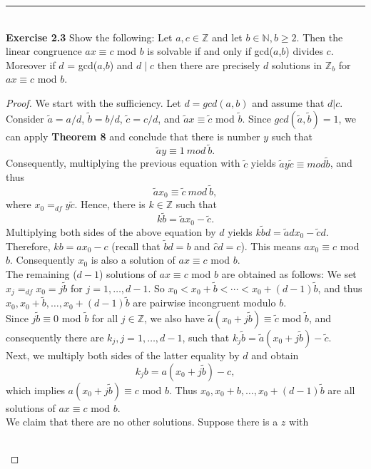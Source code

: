 \documentclass[a4paper]{article}
\begin{document}
\noindent\rule{12cm}{0.4pt}\\
\noindent \textbf{Exercise 2.3} Show the following:
Let $a, c \in \mathbb{Z}$ and let $b \in \mathbb{N}, b \geq 2$. Then the linear congruence $ax \equiv c$ mod $b$ is solvable if and only if gcd($a$,$b$) divides $c$. Moreover if $d$ = gcd($a$,$b$) and $d \mid c$ then there are precisely $d$ solutions in $\mathbb{Z}_{b}$ for $ax \equiv c$ mod $b$.
\begin{proof}
We start with the sufficiency. Let $d = gcd(a,b)$ and assume that $d|c$. Consider $\tilde{a} = a/d$, $\tilde{b} = b/d$, $\tilde{c} = c/d$, and $\tilde{a}x \equiv \tilde{c}$ mod $\tilde{b}$. Since $gcd(\tilde{a}, \tilde{b}) = 1$, we can apply \textbf{Theorem 8} and conclude that there is number $y$ such that
$$\tilde{a}y \equiv 1\ mod\ \tilde{b}.$$
Consequently, multiplying the previous equation with $\tilde{c}$ yields $\tilde{a}y\tilde{c} \equiv mod \tilde{b}$, and thus
$$\tilde{a}x_{0} \equiv \tilde{c}\ mod\ \tilde{b},$$
where $x_{0} =_{df} y\tilde{c}$. Hence, there is $k \in \mathbb{Z}$ such that
$$k\tilde{b} = \tilde{a}x_{0} - \tilde{c}.$$
Multiplying both sides of the above equation by $d$ yields $k\tilde{b}d = \tilde{a}dx_{0} - \tilde{c}d$. Therefore, $kb = ax_{0} - c$ (recall that $\tilde{b}d = b$ and $\hat{c}d = c$). This means $ax_{0} \equiv c$ mod $b$. Consequently $x_{0}$ is also a solution of $ax \equiv c$ mod $b$.\\
The remaining ($d - 1$) solutions of $ax \equiv c$ mod $b$ are obtained as follows: We set $x_{j} =_{df} x_{0} = j\tilde{b}$ for $j = 1, \ldots, d - 1$. So $x_{0} < x_{0} + \tilde{b} < \cdots < x_{0} + (d - 1)\tilde{b}$, and thus $x_{0}, x_{0} + \tilde{b}, \ldots, x_{0} + (d - 1)\tilde{b}$ are pairwise incongruent modulo $b$.\\
Since $j\tilde{b} \equiv 0$ mod $\tilde{b}$ for all $j \in \mathbb{Z}$, we also have $\tilde{a}(x_{0}+j\tilde{b}) \equiv \tilde{c}$ mod $\tilde{b}$, and consequently there are $k_{j}, j = 1, \ldots, d-1$, such that $k_{j}\tilde{b} = \tilde{a}(x_{0}+j\tilde{b}) - \tilde{c}$.\\
Next, we multiply both sides of the latter equality by $d$ and obtain
$$ k_{j}b = a(x_{0} + j\tilde{b}) - c,$$
which implies $a(x_{0} + j \tilde{b}) \equiv c$ mod $b$. Thus $x_{0}, x_{0} + b, \ldots, x_{0} + (d - 1)\tilde{b}$ are all solutions of $ax \equiv c$ mod $b$.\\
We claim that there are no other solutions. Suppose there is a $z$ with
\begin{center}
\begin{tabular}{c c c}

\end{tabular}
\end{center}
\end{proof}
\end{document}
